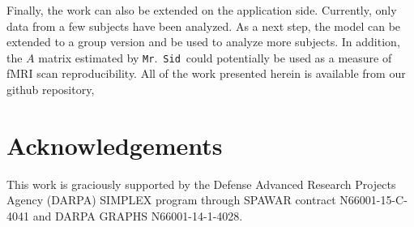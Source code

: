 \documentclass[fleqn,12pt]{article}
\newcommand{\mrsid}{{\sc \texttt{Mr}.~\texttt{Sid}}}
\begin{document}
Finally, the work can also be extended on the application side. Currently, only data from a few subjects have been analyzed. As a next step, the model can be extended to a group version and be used to analyze more subjects. In addition, the $A$ matrix estimated by \mrsid~could potentially be used as a measure of fMRI scan reproducibility.
%
%
%
All of the work presented herein is available from our github repository,


\section*{Acknowledgements}

This work is graciously supported by the Defense Advanced Research Projects Agency (DARPA) SIMPLEX program through SPAWAR contract N66001-15-C-4041 and DARPA GRAPHS N66001-14-1-4028.

%


%
%
%
\end{document}
